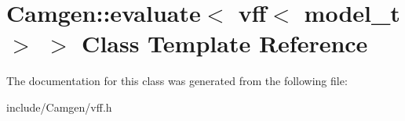 \hypertarget{a00204}{}\section{Camgen\+:\+:evaluate$<$ vff$<$ model\+\_\+t $>$ $>$ Class Template Reference}
\label{a00204}


The documentation for this class was generated from the following file\+:\begin{DoxyCompactItemize}
\item 
include/\+Camgen/vff.\+h\end{DoxyCompactItemize}
